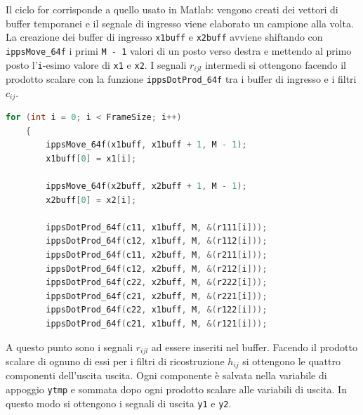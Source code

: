 \documentclass[12pt,a4paper,titlepage]{article}
\begin{document}
Il ciclo for corrisponde a quello usato in Matlab: vengono creati dei vettori di buffer temporanei e il segnale di ingresso viene elaborato un campione alla volta. La creazione dei buffer di ingresso \texttt{x1buff} e \texttt{x2buff} avviene shiftando con \texttt{ippsMove\_64f} i primi \texttt{M - 1} valori di un posto verso destra e mettendo al primo posto l'\texttt{i}-esimo valore di \texttt{x1} e \texttt{x2}. I segnali $r_{ijl}$ intermedi si ottengono facendo il prodotto scalare con la funzione \texttt{ippsDotProd\_64f} tra i buffer di ingresso e i filtri $c_{ij}$.
\begin{lstlisting}[language=cpp, label=code:rij, caption = Calcolo dei segnali intermedi, breaklines = false, captionpos = b]
	for (int i = 0; i < FrameSize; i++)
	{
		ippsMove_64f(x1buff, x1buff + 1, M - 1);
		x1buff[0] = x1[i];

		ippsMove_64f(x2buff, x2buff + 1, M - 1);
		x2buff[0] = x2[i];

		ippsDotProd_64f(c11, x1buff, M, &(r111[i]));
		ippsDotProd_64f(c12, x1buff, M, &(r112[i]));
		ippsDotProd_64f(c11, x2buff, M, &(r211[i]));
		ippsDotProd_64f(c12, x2buff, M, &(r212[i]));
		ippsDotProd_64f(c22, x2buff, M, &(r222[i]));
		ippsDotProd_64f(c21, x2buff, M, &(r221[i]));
		ippsDotProd_64f(c22, x1buff, M, &(r122[i]));
		ippsDotProd_64f(c21, x1buff, M, &(r121[i]));
\end{lstlisting}
A questo punto sono i segnali $r_{ijl}$ ad essere inseriti nel buffer. Facendo il prodotto scalare di ognuno di essi per i filtri di ricostruzione $h_{ij}$ si ottengono le quattro componenti dell'uscita uscita. Ogni componente è salvata nella variabile di appoggio \texttt{ytmp} e sommata dopo ogni prodotto scalare alle variabili di uscita. In questo modo si ottengono i segnali di uscita \texttt{y1} e \texttt{y2}.
\end{document}

